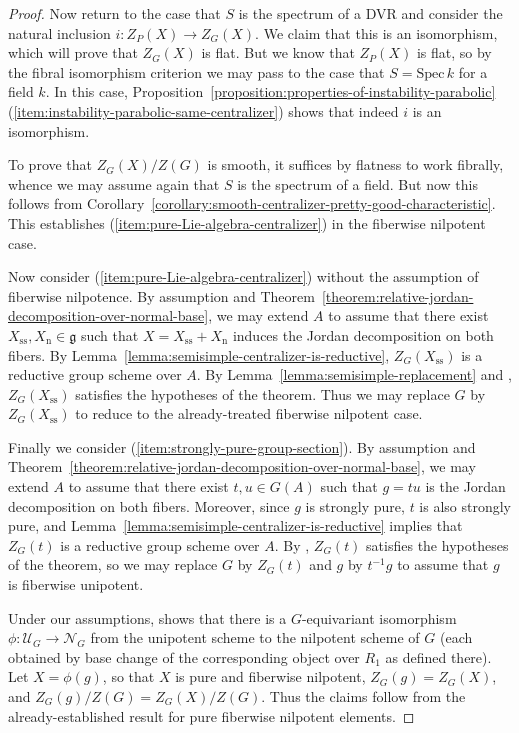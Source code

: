 \documentclass[11pt,reqno]{amsart}
\theoremstyle{definition}
\renewcommand{\rm}{\mathrm}
\newcommand{\Spec}{\mathrm{Spec} \,}
\newcommand{\sN}{{\mathscr N}}
\newcommand{\sU}{{\mathscr U}}
\newcommand{\fg}{\mathfrak{g}}
\begin{document}
\begin{proof}
Now return to the case that $S$ is the spectrum of a DVR and consider the natural inclusion $i: Z_P(X) \to Z_G(X)$. We claim that this is an isomorphism, which will prove that $Z_G(X)$ is flat. But we know that $Z_P(X)$ is flat, so by the fibral isomorphism criterion \cite[IV\textsubscript{4}, Cor.\ 17.9.5]{EGA} we may pass to the case that $S = \Spec k$ for a field $k$. In this case, Proposition~\ref{proposition:properties-of-instability-parabolic}(\ref{item:instability-parabolic-same-centralizer}) shows that indeed $i$ is an isomorphism. \smallskip

To prove that $Z_G(X)/Z(G)$ is smooth, it suffices by flatness to work fibrally, whence we may assume again that $S$ is the spectrum of a field. But now this follows from Corollary~\ref{corollary:smooth-centralizer-pretty-good-characteristic}. This establishes (\ref{item:pure-Lie-algebra-centralizer}) in the fiberwise nilpotent case. \smallskip

Now consider (\ref{item:pure-Lie-algebra-centralizer}) without the assumption of fiberwise nilpotence. By assumption and Theorem~\ref{theorem:relative-jordan-decomposition-over-normal-base}, we may extend $A$ to assume that there exist $X_{\rm{ss}}, X_{\rm{n}} \in \fg$ such that $X = X_{\rm{ss}} + X_{\rm{n}}$ induces the Jordan decomposition on both fibers. By Lemma~\ref{lemma:semisimple-centralizer-is-reductive}, $Z_G(X_{\rm{ss}})$ is a reductive group scheme over $A$. By Lemma~\ref{lemma:semisimple-replacement} and \cite[Cor.\ 3.2]{Integral-Springer}, $Z_G(X_{\rm{ss}})$ satisfies the hypotheses of the theorem. Thus we may replace $G$ by $Z_G(X_{\rm{ss}})$ to reduce to the already-treated fiberwise nilpotent case. \smallskip

Finally we consider (\ref{item:strongly-pure-group-section}). By assumption and Theorem~\ref{theorem:relative-jordan-decomposition-over-normal-base}, we may extend $A$ to assume that there exist $t, u \in G(A)$ such that $g = tu$ is the Jordan decomposition on both fibers. Moreover, since $g$ is strongly pure, $t$ is also strongly pure, and Lemma~\ref{lemma:semisimple-centralizer-is-reductive} implies that $Z_G(t)$ is a reductive group scheme over $A$. By \cite[Cor.\ 3.2]{Integral-Springer}, $Z_G(t)$ satisfies the hypotheses of the theorem, so we may replace $G$ by $Z_G(t)$ and $g$ by $t^{-1}g$ to assume that $g$ is fiberwise unipotent. \smallskip

Under our assumptions, \cite[Thm.\ 5.1]{Integral-Springer} shows that there is a $G$-equivariant isomorphism $\phi: \sU_G \to \sN_G$ from the unipotent scheme to the nilpotent scheme of $G$ (each obtained by base change of the corresponding object over $R_1$ as defined there). Let $X = \phi(g)$, so that $X$ is pure and fiberwise nilpotent, $Z_G(g) = Z_G(X)$, and $Z_G(g)/Z(G) = Z_G(X)/Z(G)$. Thus the claims follow from the already-established result for pure fiberwise nilpotent elements.
\end{proof}
\end{document}
